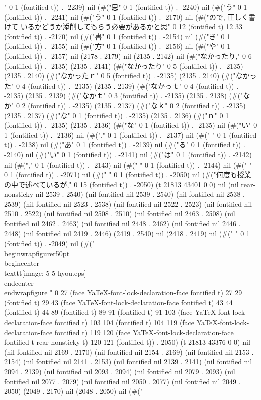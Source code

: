 " 0 1 (fontified t)) . -2239) nil (#("思" 0 1 (fontified t)) . -2240) nil (#("う" 0 1 (fontified t)) . -2241) nil (#("う" 0 1 (fontified t)) . -2170) nil (#("ので,  正しく書けて
いるかどうか添削してもらう必要があるかと思" 0 12 (fontified t) 12 33 (fontified t)) . -2170) nil (#("書" 0 1 (fontified t)) . -2154) nil (#("き" 0 1 (fontified t)) . -2155) nil (#("方" 0 1 (fontified t)) . -2156) nil (#("や" 0 1 (fontified t)) . -2157) nil (2178 . 2179) nil (2135 . 2142) nil (#("なかったり," 0 6 (fontified t)) . -2135) (2135 . 2141) (#("なかったり" 0 5 (fontified t)) . -2135) (2135 . 2140) (#("なかったｒ" 0 5 (fontified t)) . -2135) (2135 . 2140) (#("なかった" 0 4 (fontified t)) . -2135) (2135 . 2139) (#("なかっｔ" 0 4 (fontified t)) . -2135) (2135 . 2139) (#("なかｔ" 0 3 (fontified t)) . -2135) (2135 . 2138) (#("なか" 0 2 (fontified t)) . -2135) (2135 . 2137) (#("なｋ" 0 2 (fontified t)) . -2135) (2135 . 2137) (#("な" 0 1 (fontified t)) . -2135) (2135 . 2136) (#("ｎ" 0 1 (fontified t)) . -2135) (2135 . 2136) (#("な" 0 1 (fontified t)) . -2135) nil (#("い" 0 1 (fontified t)) . -2136) nil (#("," 0 1 (fontified t)) . -2137) nil (#(" " 0 1 (fontified t)) . -2138) nil (#("あ" 0 1 (fontified t)) . -2139) nil (#("る" 0 1 (fontified t)) . -2140) nil (#("い" 0 1 (fontified t)) . -2141) nil (#("は" 0 1 (fontified t)) . -2142) nil (#("," 0 1 (fontified t)) . -2143) nil (#(" " 0 1 (fontified t)) . -2144) nil (#("
" 0 1 (fontified t)) . -2071) nil (#(" " 0 1 (fontified t)) . -2050) nil (#("何度も授業の中で述べているが," 0 15 (fontified t)) . -2050) (t 21813 43401 0 0) nil (nil rear-nonsticky nil 2539 . 2540) (nil fontified nil 2539 . 2540) (nil fontified nil 2538 . 2539) (nil fontified nil 2523 . 2538) (nil fontified nil 2522 . 2523) (nil fontified nil 2510 . 2522) (nil fontified nil 2508 . 2510) (nil fontified nil 2463 . 2508) (nil fontified nil 2462 . 2463) (nil fontified nil 2448 . 2462) (nil fontified nil 2446 . 2448) (nil fontified nil 2419 . 2446) (2419 . 2540) nil (2418 . 2419) nil (#("
" 0 1 (fontified t)) . -2049) nil (#("\\begin{wrapfigure}{r}{50pt}
 \\begin{center}
  \\texttt{[image: 5-5-hyou.eps]}
  \\end{center}
\\end{wrapfigure}
" 0 27 (face YaTeX-font-lock-declaration-face fontified t) 27 29 (fontified t) 29 43 (face YaTeX-font-lock-declaration-face fontified t) 43 44 (fontified t) 44 89 (fontified t) 89 91 (fontified t) 91 103 (face YaTeX-font-lock-declaration-face fontified t) 103 104 (fontified t) 104 119 (face YaTeX-font-lock-declaration-face fontified t) 119 120 (face YaTeX-font-lock-declaration-face fontified t rear-nonsticky t) 120 121 (fontified t)) . 2050) (t 21813 43376 0 0) nil (nil fontified nil 2169 . 2170) (nil fontified nil 2154 . 2169) (nil fontified nil 2153 . 2154) (nil fontified nil 2141 . 2153) (nil fontified nil 2139 . 2141) (nil fontified nil 2094 . 2139) (nil fontified nil 2093 . 2094) (nil fontified nil 2079 . 2093) (nil fontified nil 2077 . 2079) (nil fontified nil 2050 . 2077) (nil fontified nil 2049 . 2050) (2049 . 2170) nil (2048 . 2050) nil (#("
